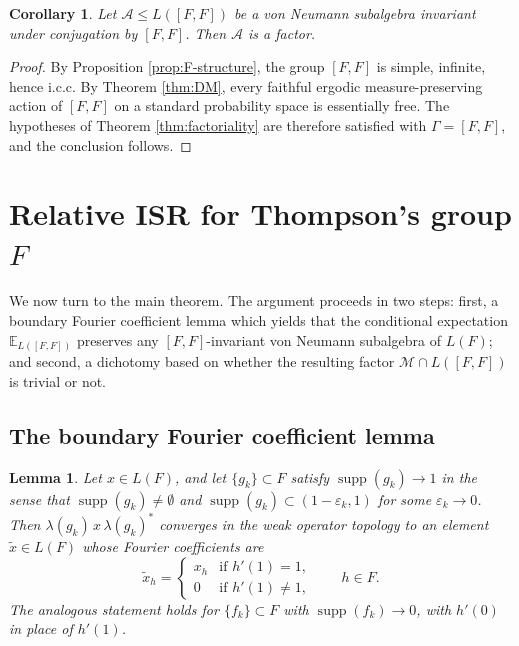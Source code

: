 \documentclass[11pt]{amsart}
\newtheorem{lemma}[theorem]{Lemma}
\newtheorem{corollary}[theorem]{Corollary}
\theoremstyle{definition}
\newcommand{\cA}{\mathcal{A}}
\newcommand{\cM}{\mathcal{M}}
\newcommand{\supp}{\operatorname{supp}}
\newcommand{\EE}{\mathbb{E}}
\begin{document}
\begin{corollary}\label{cor:F-factor}
Let $\cA \le L([F,F])$ be a von Neumann subalgebra invariant under conjugation by $[F,F]$. Then $\cA$ is a factor.
\end{corollary}

\begin{proof}
By Proposition \ref{prop:F-structure}, the group $[F,F]$ is simple, infinite, hence i.c.c. By Theorem \ref{thm:DM}, every faithful ergodic measure-preserving action of $[F,F]$ on a standard probability space is essentially free. The hypotheses of Theorem \ref{thm:factoriality} are therefore satisfied with $\Gamma = [F,F]$, and the conclusion follows.
\end{proof}

\section{Relative ISR for Thompson's group \texorpdfstring{$F$}{}}\label{sec:main}

We now turn to the main theorem. The argument proceeds in two steps: first, a boundary Fourier coefficient lemma which yields that the conditional expectation $\EE_{L([F,F])}$ preserves any $[F,F]$-invariant von Neumann subalgebra of $L(F)$; and second, a dichotomy based on whether the resulting factor $\cM \cap L([F,F])$ is trivial or not.

\subsection{The boundary Fourier coefficient lemma}

\begin{lemma}\label{lem:boundary}
Let $x \in L(F)$, and let $\{g_k\} \subset F$ satisfy $\supp(g_k) \to 1$ in the sense that $\supp(g_k) \neq \emptyset$ and $\supp(g_k) \subset (1-\varepsilon_k, 1)$ for some $\varepsilon_k \to 0$. Then $\lambda(g_k)\, x\, \lambda(g_k)^*$ converges in the weak operator topology to an element $\tilde{x} \in L(F)$ whose Fourier coefficients are
\[
\tilde{x}_h = \begin{cases} x_h & \text{if } h'(1) = 1, \\ 0 & \text{if } h'(1) \neq 1, \end{cases} \qquad h \in F.
\]
The analogous statement holds for $\{f_k\} \subset F$ with $\supp(f_k) \to 0$, with $h'(0)$ in place of $h'(1)$.
\end{lemma}
\end{document}
